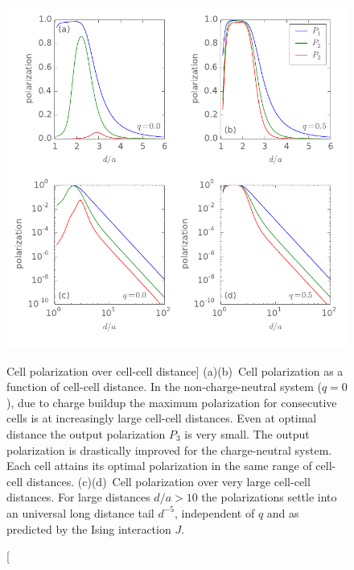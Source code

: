 \begin{figure}
  \center
  \includegraphics{three_cells_P_over_d}
  \caption
  [Cell polarization over cell-cell distance]
  {
  \label{fig:three_cells_P_over_d}
  (a)(b)~Cell polarization as a function of cell-cell distance. In the non-charge-neutral
  system ($q = 0$), due to charge buildup the maximum polarization for
  consecutive cells is at increasingly large cell-cell distances. Even at
  optimal distance the output polarization $P_3$ is very small. The output
  polarization is drastically improved for the charge-neutral system. Each cell
  attains its optimal polarization in the same range of cell-cell distances.
  (c)(d)~Cell polarization over very large cell-cell distances. For large
  distances $d/a > 10$ the polarizations settle into an universal long distance
  tail $d^{-5}$, independent of $q$ and as predicted by the Ising interaction
  $J$.
  }
\end{figure}

